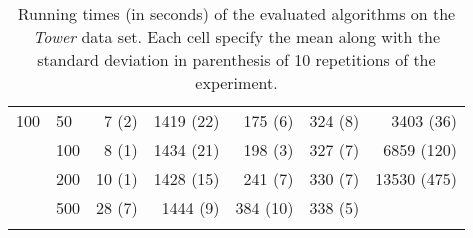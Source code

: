 \begin{longtable}{llrrrrr}
 \midrule
100 & 50  &   7 (2) &      1419 (22) &   175 (6) &              324 (8) &    3403 (36) \\
    & 100 &   8 (1) &      1434 (21) &   198 (3) &              327 (7) &   6859 (120) \\
    & 200 &  10 (1) &      1428 (15) &   241 (7) &              330 (7) &  13530 (475) \\
    & 500 &  28 (7) &       1444 (9) &  384 (10) &              338 (5) &           \\
\bottomrule
\caption{Running times (in seconds) of the evaluated algorithms on the \textit{Tower} data set. Each cell specify the mean along with the standard deviation in parenthesis of 10 repetitions of the experiment.}
\label{tab:running-time-mean-tower}
\end{longtable}

